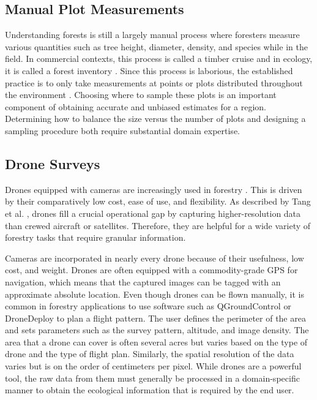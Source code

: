 \subsection{Manual Plot Measurements}
Understanding forests is still a largely manual process where foresters measure various quantities such as tree height, diameter, density, and species while in the field. In commercial contexts, this process is called a timber cruise \cite{ServiceFSHHANDBOOK} and in ecology, it is called a forest inventory \cite{USForestServiceDepartmentofAgriculture2016FORESTPLOTS}. Since this process is laborious, the established practice is to only take measurements at points or plots distributed throughout the environment \cite{Town2018ForestryMethods}. Choosing where to sample these plots is an important component of obtaining accurate and unbiased estimates for a region. Determining how to balance the size versus the number of plots and designing a sampling procedure both require substantial domain expertise. 

\subsection{Drone Surveys}
Drones equipped with cameras are increasingly used in forestry \cite{CristanDronesManagementEdited,Tang2015DronePractices}. This is driven by their comparatively low cost, ease of use, and flexibility. As described by Tang et al. \cite{Tang2015DronePractices}, drones fill a crucial operational gap by capturing higher-resolution data than crewed aircraft or satellites. Therefore, they are helpful for a wide variety of forestry tasks that require granular information.

Cameras are incorporated in nearly every drone because of their usefulness, low cost, and weight. Drones are often equipped with a commodity-grade GPS for navigation, which means that the captured images can be tagged with an approximate absolute location. Even though drones can be flown manually, it is common in forestry applications to use software such as QGroundControl \cite{QGroundControl} or DroneDeploy \cite{DroneDeploy} to plan a flight pattern. The user defines the perimeter of the area and sets parameters such as the survey pattern, altitude, and image density. The area that a drone can cover is often several acres but varies based on the type of drone and the type of flight plan. Similarly, the spatial resolution of the data varies but is on the order of centimeters per pixel.  While drones are a powerful tool, the raw data from them must generally be processed in a domain-specific manner to obtain the ecological information that is required by the end user.  

